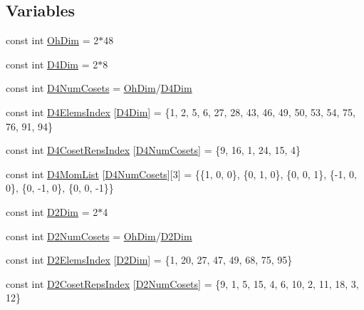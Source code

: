 \subsection*{Variables}
\begin{DoxyCompactItemize}
\item 
const int \mbox{\hyperlink{namespaceHadron_a2bea98b7ecd13619ef78b6d204d59707}{Oh\+Dim}} = 2$\ast$48
\item 
const int \mbox{\hyperlink{namespaceHadron_a7cc48609a6458d05394bf6349cfbf4ca}{D4\+Dim}} = 2$\ast$8
\item 
const int \mbox{\hyperlink{namespaceHadron_a7271d98ab4cd4b0564cf4eacf6702230}{D4\+Num\+Cosets}} = \mbox{\hyperlink{namespaceHadron_a2bea98b7ecd13619ef78b6d204d59707}{Oh\+Dim}}/\mbox{\hyperlink{namespaceHadron_a7cc48609a6458d05394bf6349cfbf4ca}{D4\+Dim}}
\item 
const int \mbox{\hyperlink{namespaceHadron_afd73b89ce6fc83184a91cff050931ff4}{D4\+Elems\+Index}} \mbox{[}\mbox{\hyperlink{namespaceHadron_a7cc48609a6458d05394bf6349cfbf4ca}{D4\+Dim}}\mbox{]} = \{1, 2, 5, 6, 27, 28, 43, 46, 49, 50, 53, 54, 75, 76, 91, 94\}
\item 
const int \mbox{\hyperlink{namespaceHadron_a9af222d257dfd087f91192daf5876c6c}{D4\+Coset\+Reps\+Index}} \mbox{[}\mbox{\hyperlink{namespaceHadron_a7271d98ab4cd4b0564cf4eacf6702230}{D4\+Num\+Cosets}}\mbox{]} = \{9, 16, 1, 24, 15, 4\}
\item 
const int \mbox{\hyperlink{namespaceHadron_aa5f7990f1895fa2ed975c2a6cbfbc284}{D4\+Mom\+List}} \mbox{[}\mbox{\hyperlink{namespaceHadron_a7271d98ab4cd4b0564cf4eacf6702230}{D4\+Num\+Cosets}}\mbox{]}\mbox{[}3\mbox{]} = \{\{1, 0, 0\}, \{0, 1, 0\}, \{0, 0, 1\}, \{-\/1, 0, 0\}, \{0, -\/1, 0\}, \{0, 0, -\/1\}\}
\item 
const int \mbox{\hyperlink{namespaceHadron_af071977674047009b141391b4256dc12}{D2\+Dim}} = 2$\ast$4
\item 
const int \mbox{\hyperlink{namespaceHadron_a4e182e6efe3c7594360137b45836d532}{D2\+Num\+Cosets}} = \mbox{\hyperlink{namespaceHadron_a2bea98b7ecd13619ef78b6d204d59707}{Oh\+Dim}}/\mbox{\hyperlink{namespaceHadron_af071977674047009b141391b4256dc12}{D2\+Dim}}
\item 
const int \mbox{\hyperlink{namespaceHadron_ad481c51b99eb36018e012864825a09fb}{D2\+Elems\+Index}} \mbox{[}\mbox{\hyperlink{namespaceHadron_af071977674047009b141391b4256dc12}{D2\+Dim}}\mbox{]} = \{1, 20, 27, 47, 49, 68, 75, 95\}
\item 
const int \mbox{\hyperlink{namespaceHadron_a3158fcd763d5c6e042be73a11c683843}{D2\+Coset\+Reps\+Index}} \mbox{[}\mbox{\hyperlink{namespaceHadron_a4e182e6efe3c7594360137b45836d532}{D2\+Num\+Cosets}}\mbox{]} = \{9, 1, 5, 15, 4, 6, 10, 2, 11, 18, 3, 12\}

\end{DoxyCompactItemize}
